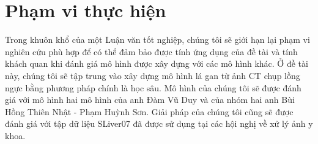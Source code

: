 \section{Phạm vi thực hiện}
Trong khuôn khổ của một Luận văn tốt nghiệp, chúng tôi sẽ giới hạn lại phạm vi nghiên cứu phù hợp để có thể đảm bảo được tính ứng dụng của đề tài và tính khách quan khi đánh giá mô hình được xây dựng với các mô hình khác. Ở đề tài này, chúng tôi sẽ tập trung vào xây dựng mô hình lá gan từ ảnh CT chụp lồng ngực bằng phương pháp chính là học sâu. Mô hình của chúng tôi sẽ được đánh giá với mô hình hai mô hình của anh Đàm Vũ Duy và của nhóm hai anh Bùi Hồng Thiên Nhật - Phạm Huỳnh Sơn. Giải pháp của chúng tôi cũng sẽ được đánh giá với tập dữ liệu SLiver07 \cite{website:slvier07} đã được sử dụng tại các hội nghị về xử lý ảnh y khoa.